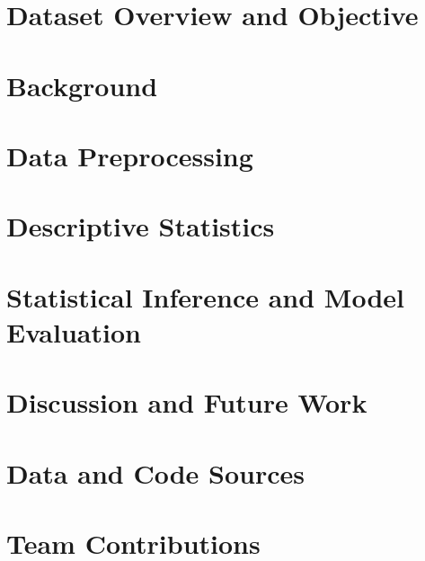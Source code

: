 
\hypersetup{pageanchor=false}
\coverpage
\frontmatter
\hypersetup{pageanchor=true}
\tableofcontents*
\listoftables
\listoffigures

\mainmatter
\renewcommand*{\clearforchapter}{\par\FloatBarrier\Needspace{9\baselineskip}}
\renewcommand*{\chapnamefont}{\normalfont\Large\bfseries}
\renewcommand*{\chapnumfont}{\chapnamefont}
\renewcommand*{\afterchapternum}{\quad}
\setlength{\afterchapskip}{12pt}
\chapter{Dataset Overview and Objective}
\label{chap:overview}

\chapter{Background}
\label{chap:background}

\chapter{Data Preprocessing}
\label{chap:preprocessing}

\chapter{Descriptive Statistics}
\label{chap:eda}

\chapter{Statistical Inference and Model Evaluation}

\chapter{Discussion and Future Work}

\chapter{Data and Code Sources}

\chapter{Team Contributions}


\backmatter

